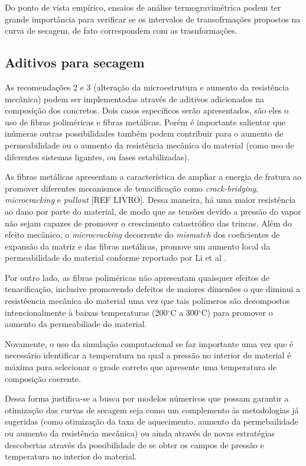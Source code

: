     Do ponto de vista empírico, ensaios de análise termogravimétrica podem ter
    grande importância para verificar se os intervalos de transofrmações
    propostos na curva de secagem, de fato correspondem com as trasnformações.

    \subsection{Aditivos para secagem}
     As recomendações 2 e 3 (alteração da microestrutura e aumento da
     resistência mecânica) podem ser implementadas através de aditivos
     adicionados na composição dos concretos. Dois casos específicos serão
     apresentados, são eles o uso de fibras poliméricas e fibras metálicas.
     Porém é importante salientar que inúmeras outras possibilidades também
     podem contribuir para o aumento de permeabilidade ou o aumento da
     resistência mecânica do material (como uso de diferentes sistemas ligantes,
     ou fases estabilizadas).

     As fibras metálicas apresentam a característica de ampliar a energia de
     fratura ao promover diferentes mecanismos de tenacificação como {\it
       crack-bridging}, {\it microcracking} e {\it pullout} [REF LIVRO]. Dessa
     maneira, há uma maior resistência ao dano por parte do material, de modo
     que as tensões devido a pressão do vapor não sejam capazes de promover o
     crescimento catastrófico das trincas. Além do efeito mecânico, o {\it
       microcracking} decorrente do {\it mismatch} dos coeficientes de expansão
     da matriz e das fibras metálicas, promove um aumento local da
     permeabilidade do material conforme reportado por Li et al \cite{li2019}.

     Por outro lado, as fibras poliméricas não apresentam quaisquer efeitos de
     tenacificação, inclusive promovendo defeitos de maiores dimenões o que
     diminui a resistêencia mecânica do material uma vez que tais polímeros são
     decompostos intencionalmente à baixas temperaturas (200$^\circ$C a
     300$^\circ$C) para promover o aumento da permeabiliade do material.

     Novamente, o uso da simulação computacional se faz importante uma vez que é
     necessário identificar a temperatura na qual a pressão no interior do
     material é máxima para selecionar o grade correto que apresente uma
     temperatura de composição coerente.

     Dessa forma justifica-se a busca por modelos númericos que possam garantir
     a otimização das curvas de secagem seja como um complemento às metodologias
     já sugeridas (como otimização da taxa de aquecimento, aumento da
     permebailidade ou aumento da resistência mecânica) ou ainda através de
     novas estratégias descobertas através da possibilidade de se obter os
     campos de pressão e temperatura no interior do material.
     
        
